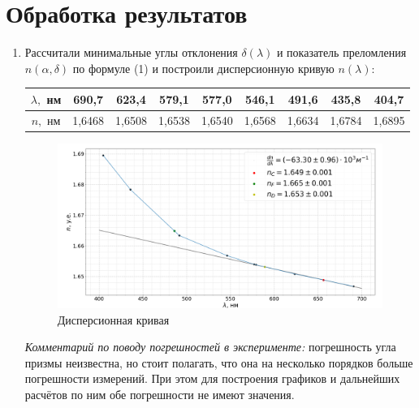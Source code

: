 \section{Обработка результатов}
\begin{enumerate}
	\item Рассчитали минимальные углы отклонения $\delta(\lambda)$ и показатель преломления $n(\alpha,\delta)$ по формуле (1) и построили дисперсионную кривую $n(\lambda)$:

	\begin{center}
	\begin{tabular}{|c|c|c|c|c|c|c|c|c|}
		\hline	
		$\lambda,$ нм & 690,7 & 623,4 & 579,1 & 577,0 & 546,1 & 491,6 & 435,8 & 404,7 \\ \hline
		$n,$ нм & 1,6468 & 1,6508 & 1,6538 & 1,6540 & 1,6568 & 1,6634 & 1,6784 & 1,6895 \\ \hline
	\end{tabular}
	\end{center}	
	
\begin{figure}[h]
			\begin{center}
				\includegraphics[width =1.05\textwidth]{graph1.png}
				\caption{Дисперсионная кривая}
			\end{center}
		\end{figure}
	
	\textit{Комментарий по поводу погрешностей в эксперименте:} погрешность угла призмы неизвестна, но стоит полагать, что она на несколько порядков больше погрешности измерений. При этом для построения графиков и дальнейших расчётов по ним обе погрешности не имеют значения.
	

\end{enumerate}

